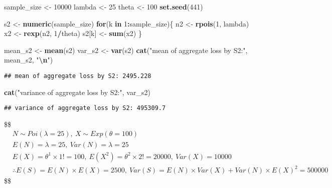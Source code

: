 \documentclass[
]{article}
\newenvironment{Shaded}{\begin{snugshade}}{\end{snugshade}}
\newcommand{\ControlFlowTok}[1]{\textcolor[rgb]{0.13,0.29,0.53}{\textbf{#1}}}
\newcommand{\DecValTok}[1]{\textcolor[rgb]{0.00,0.00,0.81}{#1}}
\newcommand{\FunctionTok}[1]{\textcolor[rgb]{0.13,0.29,0.53}{\textbf{#1}}}
\newcommand{\NormalTok}[1]{#1}
\newcommand{\OtherTok}[1]{\textcolor[rgb]{0.56,0.35,0.01}{#1}}
\newcommand{\SpecialCharTok}[1]{\textcolor[rgb]{0.81,0.36,0.00}{\textbf{#1}}}
\newcommand{\StringTok}[1]{\textcolor[rgb]{0.31,0.60,0.02}{#1}}
\begin{document}
\begin{Shaded}
\begin{Highlighting}[]
\NormalTok{sample\_size }\OtherTok{\textless{}{-}} \DecValTok{10000}
\NormalTok{lambda }\OtherTok{\textless{}{-}} \DecValTok{25}
\NormalTok{theta }\OtherTok{\textless{}{-}} \DecValTok{100}
\FunctionTok{set.seed}\NormalTok{(}\DecValTok{441}\NormalTok{)}

\NormalTok{s2 }\OtherTok{\textless{}{-}} \FunctionTok{numeric}\NormalTok{(sample\_size)}
\ControlFlowTok{for}\NormalTok{(k }\ControlFlowTok{in} \DecValTok{1}\SpecialCharTok{:}\NormalTok{sample\_size)\{}
\NormalTok{  n2 }\OtherTok{\textless{}{-}} \FunctionTok{rpois}\NormalTok{(}\DecValTok{1}\NormalTok{, lambda)}
\NormalTok{  x2 }\OtherTok{\textless{}{-}} \FunctionTok{rexp}\NormalTok{(n2, }\DecValTok{1}\SpecialCharTok{/}\NormalTok{theta)}
\NormalTok{  s2[k] }\OtherTok{\textless{}{-}} \FunctionTok{sum}\NormalTok{(x2)}
\NormalTok{\}}

\NormalTok{mean\_s2 }\OtherTok{\textless{}{-}} \FunctionTok{mean}\NormalTok{(s2)}
\NormalTok{var\_s2 }\OtherTok{\textless{}{-}} \FunctionTok{var}\NormalTok{(s2)}
\FunctionTok{cat}\NormalTok{(}\StringTok{"mean of aggregate loss by S2:"}\NormalTok{, mean\_s2, }\StringTok{"}\SpecialCharTok{\textbackslash{}n}\StringTok{"}\NormalTok{)}
\end{Highlighting}
\end{Shaded}

\begin{verbatim}
## mean of aggregate loss by S2: 2495.228
\end{verbatim}

\begin{Shaded}
\begin{Highlighting}[]
\FunctionTok{cat}\NormalTok{(}\StringTok{"variance of aggregate loss by S2:"}\NormalTok{, var\_s2)}
\end{Highlighting}
\end{Shaded}

\begin{verbatim}
## variance of aggregate loss by S2: 495309.7
\end{verbatim}

\$\$ \begin{align*}

& N \sim Poi(\lambda = 25), \: X \sim Exp(\theta = 100)
\\
& E(N) = \lambda = 25, \: Var(N) = \lambda = 25
\\
& E(X) = \theta^{1} \times 1! = 100, \: E(X^{2}) = \theta^{2} \times 2! = 20000, \: Var(X) = 10000
\\
& \therefore E(S) = E(N) \times E(X) = 2500, \: Var(S) = E(N) \times Var(X) + Var(N) \times E(X)^{2} = 500000

\end{align*} \$\$
\end{document}

